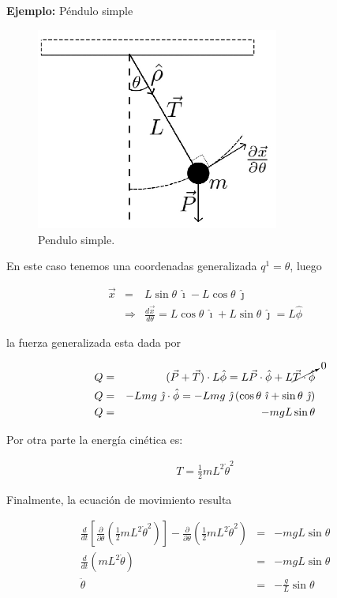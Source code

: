 \documentclass[12pt]{report}
\begin{document}
\textbf{Ejemplo:} Péndulo simple  \\


\begin{figure}
	\begin{center}
	\includegraphics[width=8cm]{figura31.png} 
	\caption{ Pendulo simple.}
	\label{fig.1}
	\end{center}
\end{figure} 


En este caso tenemos una coordenadas generalizada $q^1=\theta$, luego 

\begin{eqnarray}
\vec{x}&=& L \sin{\theta} \ \hat{\imath} - L\cos{\theta} \ \hat{\jmath} \\
&\Rightarrow& \frac{d \vec{x}}{d\theta} = L \cos{\theta} \ \hat{\imath} + L\sin{\theta} \ \hat{\jmath} = L \hat{\phi}
\end{eqnarray}

la fuerza generalizada esta dada por


\begin{eqnarray}
Q&=&(\vec{P}+\vec{T}) \cdot L\hat{\phi} 
= L\vec{P} \cdot \hat{\phi} + L \cancelto{0}{\vec{T} \cdot \hat{\phi}} \\
Q&=&-Lmg \ \hat{\jmath} \cdot \hat{\phi} = -Lmg \ \hat{\jmath} \left( \cos{\theta} \ \hat{\imath} + \sin{\theta} \ \hat{\jmath} \right) \\
Q&=&-mgL \sin{\theta}
\end{eqnarray}


Por otra parte la energía cinética es:

\begin{eqnarray}
T=\frac{1}{2} m L^2 \dot{\theta}^2
\end{eqnarray}

Finalmente, la ecuación de movimiento resulta 

\begin{eqnarray}
\frac{d}{dt} \left[ \frac{\partial}{\partial \theta} \left( \frac{1}{2} mL^2 \dot{\theta}^2 \right) \right] - \frac{\partial}{\partial \theta} \left( \frac{1}{2}mL^2 \dot{\theta}^2 \right) &=& - mgL \sin{\theta} \\
\frac{d}{dt} \left( mL^2 \dot{\theta} \right) &=&-mgL\sin{\theta} \\
\ddot{\theta} &=& -\frac{g}{L} \sin{\theta}
\end{eqnarray} 
\end{document}
